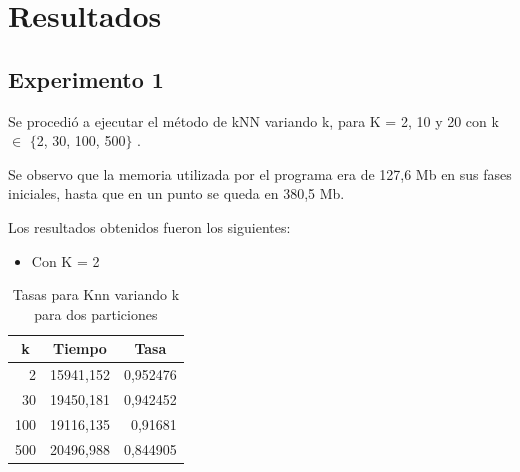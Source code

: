 \section{Resultados}



\subsection{Experimento 1}
Se procedió a ejecutar el método de kNN variando k, para K = 2, 10 y 20 con k $\in$ $\{$2, 30, 100, 500$\}$ .

Se observo que la memoria utilizada por el programa era de 127,6 Mb en sus fases iniciales, hasta que en un punto se queda en 380,5 Mb.

Los resultados obtenidos fueron los siguientes:
\begin{itemize}
\item Con K = 2\\
\end{itemize}

\begin{table}[H]
\centering
\begin{tabular}{|r|r|r|}
\hline
\multicolumn{1}{|c|}{k} & \multicolumn{1}{c|}{Tiempo} & \multicolumn{1}{c|}{Tasa} \\ \hline
2 & 15941,152 & 0,952476 \\ \hline
30 & 19450,181 & 0,942452 \\ \hline
100 & 19116,135 & 0,91681 \\ \hline
500 & 20496,988 & 0,844905 \\ \hline
\end{tabular}
\caption{Tasas para Knn variando k para dos particiones}
\label{}
\end{table}

\bigskip
\bigskip
\bigskip


